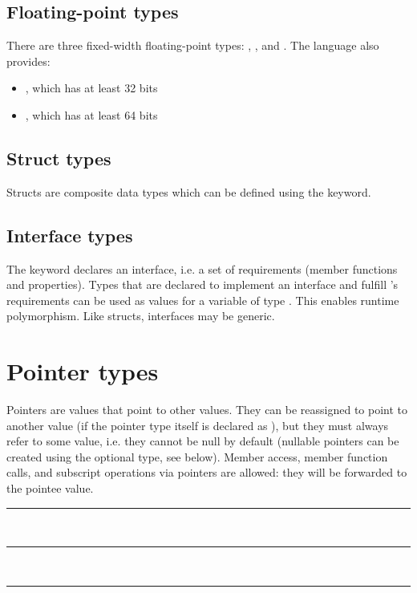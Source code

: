 \subsection{Floating-point types}

There are three fixed-width floating-point types: ,
, and . The language also provides:

\begin{itemize}
\item {}, which has at least 32 bits
\item {}, which has at least 64 bits
\end{itemize}

\subsection{Struct types}

Structs are composite data types which can be defined using the 
keyword.

\subsection{Interface types}

The  keyword declares an interface, i.e. a set of requirements
(member functions and properties). Types that are declared to implement an
interface  and fulfill 's requirements can be used as values for
a variable of type . This enables runtime polymorphism. Like structs,
interfaces may be generic.

\section{Pointer types}

Pointers are values that point to other values. They can be reassigned to point
to another value (if the pointer type itself is declared as ), but
they must always refer to some value, i.e. they cannot be null by default
(nullable pointers can be created using the optional type, see below). Member
access, member function calls, and subscript operations via pointers are
allowed: they will be forwarded to the pointee value.

\begin{grammar}
\rule{pointer-type}  \code{*}\\
\rule{pointer-type}   \code{*}\\
\rule{pointee-type} 
\end{grammar}

